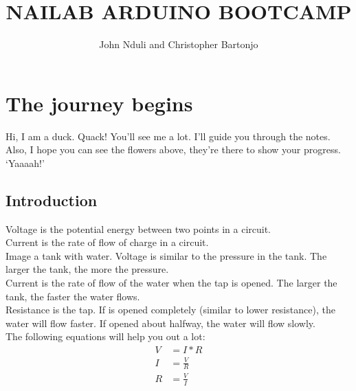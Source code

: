 \documentclass[14pt, oneside]{memoir}
\begin{document}
\title{\textbf{NAILAB ARDUINO BOOTCAMP}}
\author{John Nduli and Christopher Bartonjo} 
 \maketitle



\setlength{\parskip}{1.5\baselineskip}
\setlength{\parindent}{0pt}
\chapter{The journey begins}
Hi, I am a duck. Quack! You'll see me a lot. I'll guide you
through the notes. Also, I hope you can see the flowers above,
they're there to show your progress. `Yaaaah!'

\section*{Introduction}
Voltage is the potential energy between two points in a circuit.
\\
Current is the rate of flow of charge in a circuit.
\\
Image a tank with water. Voltage is similar to the pressure in the
tank. The larger the tank, the more the pressure.
\\
Current is the rate of flow of the water when the tap is opened.
The larger the tank, the faster the water flows.
\\
Resistance is the tap. If is opened completely (similar to lower
resistance), the water will flow faster. If opened about halfway,
the water will flow slowly.
\\
The following equations will help you out a lot:
\begin{align}
    V &= I * R \\
    I &= \frac{V}{R}\\
    R &= \frac{V}{I}
\end{align}
\end{document}
